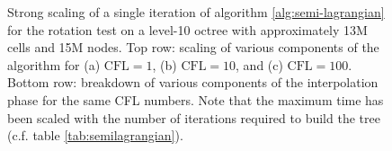 \begin{figure}[htbp]
\begin{center}
	\end{center}
	\caption{Strong scaling of a single iteration of algorithm \ref{alg:semi-lagrangian} for the rotation test on a level-10 octree with approximately 13M cells and 15M nodes. Top row: scaling of various components of the algorithm for (a) $\text{CFL} = 1$, (b) $\text{CFL} = 10$, and (c) $\text{CFL} = 100$. Bottom row: breakdown of various components of the interpolation phase for the same CFL numbers. Note that the maximum time has been scaled with the number of iterations required to build the tree (c.f. table \ref{tab:semilagrangian}).}
	\label{fig:semilagrangian_small}
\end{figure}

